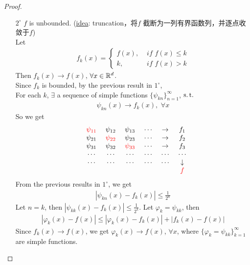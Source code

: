 \begin{thm}
\begin{proof}
\begin{enumerate}
\begin{enumerate}
					\newpage
					\item[$2^{\circ}$]$f$ is unbounded. (\underline{idea}: truncation，将$f$ 截断为一列有界函数列，并逐点收敛于$f$)\\
					Let
					\begin{align}
						f_{k}(x) = 
						\begin{cases}
							f(x) , \,\, &if \,\, f(x) \leq k \\
							k , &if \,\, f(x) > k
						\end{cases}
					\end{align}	
					Then $f_{k}(x) \to f(x)$, $\forall x \in \mathbb{R}^d$. \\
					Since $f_k$ is bounded, by the previous result in $1^{\circ}$, \\
					For each $k$, $\exists$ a sequence of simple functions $\{ \psi_{kn} \}_{n = 1}^{\infty}$, $\operatorname{s.t.}$
					\begin{align}
						\psi_{kn}(x) \to f_{k}(x) , \,\, \forall x
					\end{align}
					So we get
					\begin{align}
						\begin{matrix}
							&\textcolor{red}{\psi_{11}} \,\, &\psi_{12} \,\, &\psi_{13} \,\, &\cdots \,\, &\to \,\, &f_1 \\
							&\psi_{21} \,\, &\textcolor{red}{\psi_{22}} \,\, &\psi_{23} \,\, &\cdots \,\, &\to \,\, &f_2 \\
							&\psi_{31} \,\, &\psi_{32} \,\, &\textcolor{red}{\psi_{33}} \,\, &\cdots \,\, &\to \,\, &f_3 \\
							&\cdots \,\, &\cdots \,\, &\cdots \,\, &\cdots \,\, &\cdots \,\, &\cdots \\
							&\cdots \,\, &\cdots \,\, &\cdots \,\, &\cdots \,\, &\cdots \,\, &\downarrow \\
							& & & & & &\textcolor{red}{f} \\
						\end{matrix}
					\end{align}
					From the previous results in $1^{\circ}$, we get
					\begin{align}
						\left| \psi_{kn}(x) - f_k(x) \right| \leq \frac{1}{2^n}
					\end{align}
					Let $n = k$, then $\left| \psi_{kk}(x) - f_k(x) \right| \leq \frac{1}{2^k}$. Let $\varphi_k = \psi_{kk}$, then
					\begin{align}
						\left| \varphi_{k}(x) - f(x) \right| 
						\leq \left| \varphi_{k}(x) - f_{k}(x) \right| + \left| f_{k}(x) - f(x) \right|
					\end{align}
					Since $f_{k}(x) \to f(x)$, we get $\varphi_{k}(x) \to f(x)$, $\forall x$, where $\{ \varphi_k = \psi_{kk} \}_{k = 1}^{\infty}$ are simple functions.
				\end{enumerate}
				

\end{enumerate}
\end{proof}
\end{thm}

